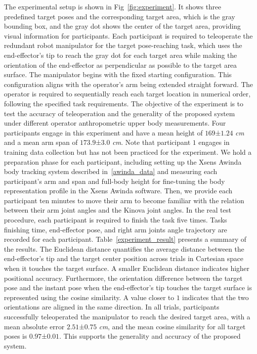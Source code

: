 
The experimental setup is shown in Fig~\ref{fig:experiment}. It shows three predefined target poses and the corresponding target area, which is the gray bounding box, and the gray dot shows the center of the target area, providing visual information for participants. Each participant is required to teleoperate the redundant robot manipulator for the target pose-reaching task, which uses the end-effector's tip to reach the gray dot for each target area while making the orientation of the end-effector as perpendicular as possible to the target area surface. The manipulator begins with the fixed starting configuration. This configuration aligns with the operator’s arm being extended straight forward. The operator is required to sequentially reach each target location in numerical order, following the specified task requirements. The objective of the experiment is to test the accuracy of teleoperation and the generality of the proposed system under different operator anthropometric upper body measurements. Four participants engage in this experiment and have a mean height of $169$±$1.24$ \textit{cm} and a mean arm span of $173.9$±$3.0$ \textit{cm}. Note that participant $1$ engages in training data collection but has not been practiced for the experiment. We hold a preparation phase for each participant, including setting up the Xsens Awinda body tracking system described in~\ref{awinda_data} and measuring each participant's arm and span and full-body height for fine-tuning the body representation profile in the Xsens Awinda software. Then, we provide each participant ten minutes to move their arm to become familiar with the relation between their arm joint angles and the Kinova joint angles. In the real test procedure, each participant is required to finish the task five times. Tasks finishing time, end-effector pose, and right arm joints angle trajectory are recorded for each participant.
Table~\ref{experiment_result} presents a summary of the results. The Euclidean distance quantifies the average distance between the end-effector's tip and the target center position across trials in Cartesian space when it touches the target surface. A smaller Euclidean distance indicates higher positional accuracy. Furthermore, the orientation difference between the target pose and the instant pose when the end-effector's tip touches the target surface is represented using the cosine similarity. A value closer to $1$ indicates that the two orientations are aligned in the same direction. In all trials, participants successfully teleoperated the manipulator to reach the desired target area, with a mean absolute error $2.51$±$0.75$ \textit{cm}, and the mean cosine similarity for all target poses is $0.97$±$0.01$. This supports the generality and accuracy of the proposed system.

